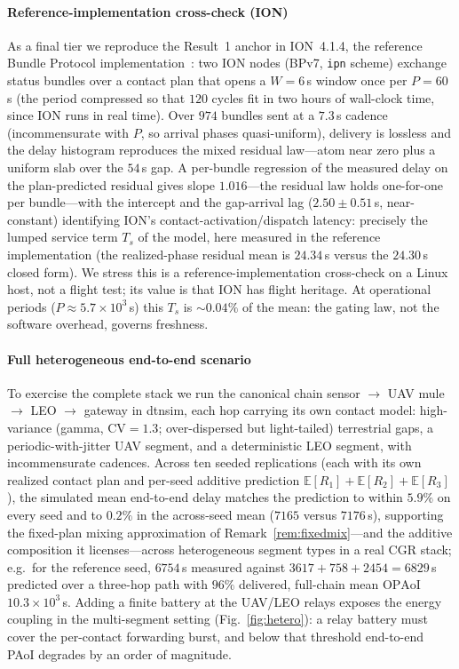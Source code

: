 \documentclass[twocolumn,3p,times,procedia]{elsarticle}
\newcommand{\OPAoI}{\mathrm{OPAoI}}
\newcommand{\E}{\mathbb{E}}
\begin{document}
\paragraph*{Reference-implementation cross-check (ION)}
As a final tier we reproduce the Result~1 anchor in ION~4.1.4, the
reference Bundle Protocol implementation~\cite{burleigh2007ion}: two ION
nodes (BPv7, \texttt{ipn} scheme) exchange status bundles over a
contact plan that opens a $W{=}6$\,s window once per $P{=}60$\,s (the
period compressed so that $120$ cycles fit in two hours of wall-clock
time, since ION runs in real time). Over $974$ bundles sent at a
$7.3$\,s cadence (incommensurate with $P$, so arrival phases
quasi-uniform), delivery is lossless and the delay histogram reproduces
the mixed residual law---atom near zero plus a uniform slab over the
$54$\,s gap. A per-bundle regression of the measured delay on the
plan-predicted residual gives slope $1.016$---the residual law holds
one-for-one per bundle---with the intercept and the gap-arrival lag
($2.50\pm0.51$\,s, near-constant) identifying ION's
contact-activation/dispatch latency: precisely the lumped service term
$T_s$ of the model, here measured in the reference implementation (the
realized-phase residual mean is $24.34$\,s versus the $24.30$\,s closed
form). We stress this is a reference-implementation cross-check on a
Linux host, not a flight test; its value is that ION has flight
heritage. At operational periods
($P\approx5.7\times10^3$\,s) this $T_s$ is ${\sim}0.04\%$ of the mean:
the gating law, not the software overhead, governs freshness.

\paragraph*{Full heterogeneous end-to-end scenario}
To exercise the complete stack we run the canonical chain sensor $\to$ UAV
mule $\to$ LEO $\to$ gateway in dtnsim, each hop carrying its own contact
model: high-variance (gamma, $\mathrm{CV}{=}1.3$; over-dispersed but
light-tailed) terrestrial gaps, a periodic-with-jitter UAV segment, and a
deterministic LEO segment, with incommensurate cadences. Across ten
seeded replications (each with its own realized contact plan and
per-seed additive prediction $\E[R_1]{+}\E[R_2]{+}\E[R_3]$), the
simulated mean end-to-end delay matches the prediction to within
$5.9\%$ on every seed and to $0.2\%$ in the across-seed mean
($7165$ versus $7176$\,s), supporting the fixed-plan mixing
approximation of Remark~\ref{rem:fixedmix}---and the additive
composition it licenses---across heterogeneous segment types in a
real CGR stack; e.g.\ for the reference seed, $6754$\,s measured
against $3617{+}758{+}2454{=}6829$\,s predicted over a three-hop path
with $96\%$ delivered, full-chain mean $\OPAoI$ $10.3\times10^3$\,s. Adding a finite battery at the UAV/LEO relays
exposes the energy coupling in the multi-segment setting
(Fig.~\ref{fig:hetero}): a relay battery must cover the per-contact
forwarding burst, and below that threshold end-to-end PAoI degrades by an
order of magnitude.
\end{document}
